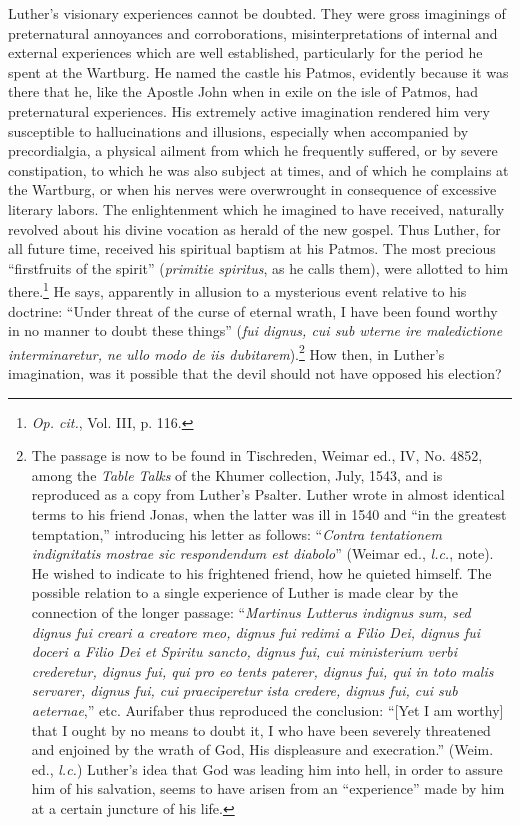 Luther’s visionary experiences cannot be doubted. They were gross
imaginings of preternatural annoyances and corroborations, misinterpretations
of internal and external experiences which are well established, particularly
for the period he spent at the Wartburg. He
named the castle his Patmos, evidently because it was there that he,
like the Apostle John when in exile on the isle of Patmos, had
preternatural experiences. His extremely active imagination rendered him
very susceptible to hallucinations and illusions, especially
when accompanied by precordialgia, a physical ailment from which
he frequently suffered, or by severe constipation, to which he was
also subject at times, and of which he complains at the Wartburg, or
when his nerves were overwrought in consequence of excessive literary labors.
The enlightenment which he imagined to have received, naturally
revolved about his divine vocation as herald of the new gospel. Thus
Luther, for all future time, received his spiritual baptism at his Patmos.
The most precious “firstfruits of the spirit” (\textit{primitie spiritus},
as he calls them), were allotted to him there.\footnote{\textit{Op. cit.}, Vol. III, p. 116.}
He says, apparently
in allusion to a mysterious event relative to his doctrine: “Under
threat of the curse of eternal wrath, I have been found worthy in no
manner to doubt these things” (\textit{fui dignus, cui sub wterne ire maledictione
interminaretur, ne ullo modo de iis dubitarem}).\footnote
{The passage is now to be found in Tischreden, Weimar ed., IV, No. 4852, among the
\textit{Table Talks} of the Khumer collection, July, 1543, and is reproduced as a copy from
Luther’s Psalter. Luther wrote in almost identical terms to his friend Jonas, when the latter
was ill in 1540 and “in the greatest temptation,” introducing his letter as follows: “\textit{Contra
tentationem indignitatis mostrae sic respondendum est diabolo}” (Weimar ed., \textit{l.c.}, note). He
wished to indicate to his frightened friend, how he quieted himself. The possible relation
to a single experience of Luther is made clear by the connection of the longer passage:
“\textit{Martinus Lutterus indignus sum, sed dignus fui creari a creatore meo, dignus fui redimi a
Filio Dei, dignus fui doceri a Filio Dei et Spiritu sancto, dignus fui, cui ministerium verbi
crederetur, dignus fui, qui pro eo tents paterer, dignus fui, qui in toto malis servarer,
dignus fui, cui praeciperetur ista credere, dignus fui, cui sub aeternae},” etc. Aurifaber thus
reproduced the conclusion: “[Yet I am worthy] that I ought by no means to doubt it, I
who have been severely threatened and enjoined by the wrath of God, His displeasure and
execration.” (Weim. ed., \textit{l.c.}) Luther’s idea that God was leading him into hell, in order to
assure him of his salvation, seems to have arisen from an “experience” made by him at a
certain juncture of his life.}
How then,
in Luther’s imagination, was it possible that the devil should not have
opposed his election?

